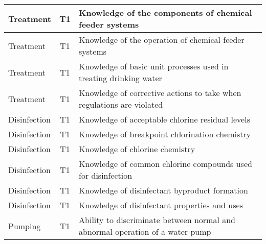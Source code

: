 \documentclass{article}
\begin{document}
\begin{table}[]
\begin{tabular}{|l|c|l|}
Treatment                              & T1             & Knowledge of the   components of chemical feeder systems                                                                          \\ \hline
Treatment                              & T1             & Knowledge of the   operation of chemical feeder systems                                                                           \\ \hline
Treatment                              & T1             & Knowledge of basic   unit processes used in treating drinking water                                                               \\ \hline
Treatment                              & T1             & Knowledge of   corrective actions to take when regulations are violated                                                           \\ \hline
Disinfection                           & T1             & Knowledge of   acceptable chlorine residual levels                                                                                \\ \hline
Disinfection                           & T1             & Knowledge of   breakpoint chlorination chemistry                                                                                  \\ \hline
Disinfection                           & T1             & Knowledge of chlorine   chemistry                                                                                                 \\ \hline
Disinfection                           & T1             & Knowledge of common   chlorine compounds used for disinfection                                                                    \\ \hline
Disinfection                           & T1             & Knowledge of   disinfectant byproduct formation                                                                                   \\ \hline
Disinfection                           & T1             & Knowledge of   disinfectant properties and uses                                                                                   \\ \hline
Pumping                                & T1             & Ability to   discriminate between normal and abnormal operation of a water pump                                                   \\ \hline

\end{tabular}
\end{table}
\end{document}
